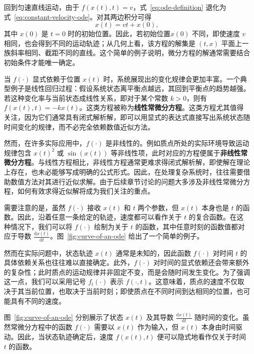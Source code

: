 回到匀速直线运动，由于 \(f(x(t),t)=v\)，式~\eqref{eq:ode-definition} 退化为式~\eqref{eq:constant-velocity-ode}。对其两边积分可得
\begin{equation}
x(t)
=
vt+x(0),
\label{eq:uniform-linear-motion}
\end{equation}
其中 \(x(0)\) 是 \(t=0\) 时的初始位置。因此，若初始位置\(x(0)\) 不同，即使速度 \(v\) 相同，也会得到不同的运动轨迹；从几何上看，该方程的解集是 \((t,x)\) 平面上一族斜率相同、截距不同的直线。这个简单的例子说明，微分方程的解通常需要结合初始条件才能唯一确定。

当 \(f(\cdot)\) 显式依赖于位置 \(x(t)\) 时，系统展现出的变化规律会更加丰富。一个典型例子是线性回归过程：假设系统状态离平衡点越远，其回到平衡点的趋势越强。若这种变化率与当前状态成线性关系，即对于某个常数 \(k > 0\)，则有 \(f(x(t),t)=-kx(t)\)。这类方程被称为\textbf{线性常微分方程}。这类方程尤其值得关注，因为它们通常具有闭式解析解，即可以用显式的表达式直接写出系统状态随时间变化的规律，而不必完全依赖数值近似方法。 

然而，在许多实际应用中，\(f(\cdot)\) 是非线性的。例如质点所处的实际环境导致运动规律包含 \(x(t)^2\) 或 \(\sin(x(t))\) 等非线性项，此时对应的方程便属于\textbf{非线性常微分方程}。与线性方程相比，非线性方程通常更难求得闭式解析解，即使解在理论上存在，也未必能够写成明确的公式形式。因此，在处理复杂系统时，往往需要借助数值方法对其进行近似求解。由于后续章节讨论的问题大多涉及非线性常微分方程，如何有效求得近似解将成为我们关注的重点。 

需要注意的是，虽然 \(f(\cdot)\) 接收 \(x(t)\) 和 \(t\) 两个参数，但 \(x(t)\) 本身也是 \(t\) 的函数。因此，沿着任意一条给定的轨迹，速度都可以看作关于 \(t\) 的复合函数。在这种情况下，我们可以将 \(f(\cdot)\) 绘制为关于 \(t\) 的函数，其中任意时刻的函数值都对应于导数 \(\frac{\mathrm{d}x(t)}{\mathrm{d}t}\)。图~\ref{fig:curve-of-an-ode} 给出了一个简单的例子。

然而在实际问题中，状态轨迹 \(x(t)\) 通常是未知的，因此函数 \(f(\cdot)\) 对时间 \(t\) 的具体依赖关系也往往难以直接确定。此外，\(f(\cdot)\) 对时间的显式依赖还会带来额外的复杂性；此时质点的运动规律并非固定不变，而是会随时间发生变化。为了强调这一点，我们可以采用记号 \(f_t(\cdot)\) 表示 \(f(\cdot,t)\)。这意味着，质点的速度不仅取决于其当前位置，也取决于当前时刻；即使质点在不同时间到达相同的位置，也可能具有不同的速度。

图~\ref{fig:curve-of-an-ode} 分别展示了状态 \(x(t)\) 及其导数 \(\frac{\mathrm{d}x(t)}{\mathrm{d}t}\) 随时间的变化。虽然常微分方程中的函数 \(f(\cdot)\) 需要以 \(x(t)\) 作为输入，但 \(x(t)\) 本身由时间驱动。因此，当状态轨迹确定后，速度 \(f(x(t),t)\) 便可以隐式地看作仅关于时间 \(t\) 的函数。

